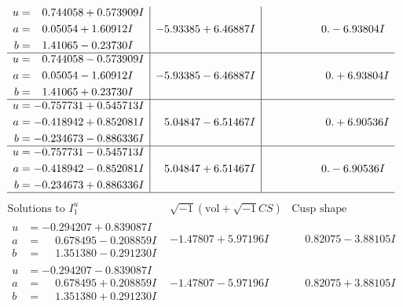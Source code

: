 \documentclass[1p]{elsarticle_modified}
\theoremstyle{definition}
\newcommand{\I}{\sqrt{-1}}
\begin{document}
$$\begin{array}{c|c|c}
\begin{aligned}
u &= \phantom{-}0.744058 + 0.573909 I \\
a &= \phantom{-}0.05054 + 1.60912 I \\
b &= \phantom{-}1.41065 - 0.23730 I\end{aligned}
 & -5.93385 + 6.46887 I & \phantom{-0.000000 } 0. - 6.93804 I \\ \hline\begin{aligned}
u &= \phantom{-}0.744058 - 0.573909 I \\
a &= \phantom{-}0.05054 - 1.60912 I \\
b &= \phantom{-}1.41065 + 0.23730 I\end{aligned}
 & -5.93385 - 6.46887 I & \phantom{-0.000000 -}0. + 6.93804 I \\ \hline\begin{aligned}
u &= -0.757731 + 0.545713 I \\
a &= -0.418942 + 0.852081 I \\
b &= -0.234673 - 0.886336 I\end{aligned}
 & \phantom{-}5.04847 - 6.51467 I & \phantom{-0.000000 -}0. + 6.90536 I \\ \hline\begin{aligned}
u &= -0.757731 - 0.545713 I \\
a &= -0.418942 - 0.852081 I \\
b &= -0.234673 + 0.886336 I\end{aligned}
 & \phantom{-}5.04847 + 6.51467 I & \phantom{-0.000000 } 0. - 6.90536 I\\
 \hline 
 \end{array}$$\newpage$$\begin{array}{c|c|c}  
\text{Solutions to }I^u_{1}& \I (\text{vol} + \sqrt{-1}CS) & \text{Cusp shape}\\
 \hline 
\begin{aligned}
u &= -0.294207 + 0.839087 I \\
a &= \phantom{-}0.678495 - 0.208859 I \\
b &= \phantom{-}1.351380 - 0.291230 I\end{aligned}
 & -1.47807 + 5.97196 I & \phantom{-}0.82075 - 3.88105 I \\ \hline\begin{aligned}
u &= -0.294207 - 0.839087 I \\
a &= \phantom{-}0.678495 + 0.208859 I \\
b &= \phantom{-}1.351380 + 0.291230 I\end{aligned}
 & -1.47807 - 5.97196 I & \phantom{-}0.82075 + 3.88105 I \\ \hline\begin{aligned}

\end{aligned}
\end{array}$$
\end{document}
